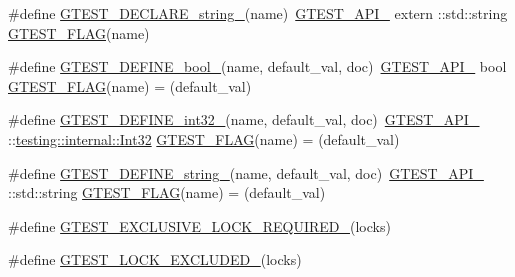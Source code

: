 \begin{DoxyCompactItemize}
$$\item 
\#define \mbox{\hyperlink{gtest-port_8h_a9f74eee05f7ee5534139a622fe7da7dd}{G\+T\+E\+S\+T\+\_\+\+D\+E\+C\+L\+A\+R\+E\+\_\+string\+\_\+}}(name)~\mbox{\hyperlink{gtest-port_8h_aa73be6f0ba4a7456180a94904ce17790}{G\+T\+E\+S\+T\+\_\+\+A\+P\+I\+\_\+}} extern \+::std\+::string \mbox{\hyperlink{gtest-port_8h_a828f4e34a1c4b510da50ec1563e3562a}{G\+T\+E\+S\+T\+\_\+\+F\+L\+AG}}(name)
\item 
\#define \mbox{\hyperlink{gtest-port_8h_a48e05814779e5a2f432b06a12618a760}{G\+T\+E\+S\+T\+\_\+\+D\+E\+F\+I\+N\+E\+\_\+bool\+\_\+}}(name,  default\+\_\+val,  doc)~\mbox{\hyperlink{gtest-port_8h_aa73be6f0ba4a7456180a94904ce17790}{G\+T\+E\+S\+T\+\_\+\+A\+P\+I\+\_\+}} bool \mbox{\hyperlink{gtest-port_8h_a828f4e34a1c4b510da50ec1563e3562a}{G\+T\+E\+S\+T\+\_\+\+F\+L\+AG}}(name) = (default\+\_\+val)
\item 
\#define \mbox{\hyperlink{gtest-port_8h_a88ee2f19589ffff86ca742fd33611358}{G\+T\+E\+S\+T\+\_\+\+D\+E\+F\+I\+N\+E\+\_\+int32\+\_\+}}(name,  default\+\_\+val,  doc)~\mbox{\hyperlink{gtest-port_8h_aa73be6f0ba4a7456180a94904ce17790}{G\+T\+E\+S\+T\+\_\+\+A\+P\+I\+\_\+}} \+::\mbox{\hyperlink{namespacetesting_1_1internal_a8ee38faaf875f133358abaf9bc056cec}{testing\+::internal\+::\+Int32}} \mbox{\hyperlink{gtest-port_8h_a828f4e34a1c4b510da50ec1563e3562a}{G\+T\+E\+S\+T\+\_\+\+F\+L\+AG}}(name) = (default\+\_\+val)
\item 
\#define \mbox{\hyperlink{gtest-port_8h_a885e18fe217a6e85553d408b99252c12}{G\+T\+E\+S\+T\+\_\+\+D\+E\+F\+I\+N\+E\+\_\+string\+\_\+}}(name,  default\+\_\+val,  doc)~\mbox{\hyperlink{gtest-port_8h_aa73be6f0ba4a7456180a94904ce17790}{G\+T\+E\+S\+T\+\_\+\+A\+P\+I\+\_\+}} \+::std\+::string \mbox{\hyperlink{gtest-port_8h_a828f4e34a1c4b510da50ec1563e3562a}{G\+T\+E\+S\+T\+\_\+\+F\+L\+AG}}(name) = (default\+\_\+val)
\item 
\#define \mbox{\hyperlink{gtest-port_8h_a149f693bd59fa1bc937af54c0cdcb32f}{G\+T\+E\+S\+T\+\_\+\+E\+X\+C\+L\+U\+S\+I\+V\+E\+\_\+\+L\+O\+C\+K\+\_\+\+R\+E\+Q\+U\+I\+R\+E\+D\+\_\+}}(locks)
\item 
\#define \mbox{\hyperlink{gtest-port_8h_a69abff5a4efdd07bd5faebe3dd318d06}{G\+T\+E\+S\+T\+\_\+\+L\+O\+C\+K\+\_\+\+E\+X\+C\+L\+U\+D\+E\+D\+\_\+}}(locks)
\end{DoxyCompactItemize}
